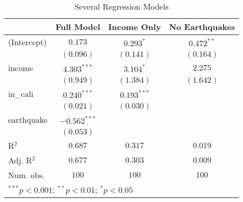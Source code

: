 
\begin{table}
\begin{center}
\begin{tabular}{l c c c}
\hline
 & Full Model & Income Only & No Earthquakes \\
\hline
(Intercept) & $0.173$        & $0.293^{*}$   & $0.472^{**}$ \\
            & $(0.096)$      & $(0.141)$     & $(0.164)$    \\
income      & $4.303^{***}$  & $3.104^{*}$   & $2.275$      \\
            & $(0.949)$      & $(1.384)$     & $(1.642)$    \\
in\_cali    & $0.240^{***}$  & $0.193^{***}$ &              \\
            & $(0.021)$      & $(0.030)$     &              \\
earthquake  & $-0.562^{***}$ &               &              \\
            & $(0.053)$      &               &              \\
\hline
R$^2$       & $0.687$        & $0.317$       & $0.019$      \\
Adj. R$^2$  & $0.677$        & $0.303$       & $0.009$      \\
Num. obs.   & $100$          & $100$         & $100$        \\
\hline
\multicolumn{4}{l}{\scriptsize{$^{***}p<0.001$; $^{**}p<0.01$; $^{*}p<0.05$}}
\end{tabular}
\caption{Several Regression Models}
\label{tab:lm_all_models}
\end{center}
\end{table}
